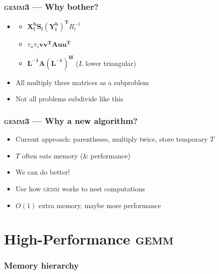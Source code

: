\documentclass{beamer}
\newcommand*{\gemmt}{{\textsc{gemm3}}}
\newcommand*{\gemm}{{\textsc{gemm}}}
\begin{document}
\begin{frame}
  \frametitle{\gemmt{} --- Why bother?}
  \begin{itemize}
  \item
    \begin{itemize}
    \item $\bm{X_i^b S_i (Y_i^b)^T}R_i^{-1}$
    \item $\tau_u\tau_v \bm{vv^TAuu^T}$
    \item$\bm{L^{-1}A(L^{-1})^H}$ ($L$ lower triangular)
    \end{itemize}
  \item All multiply three matrices as a subproblem
  \item Not all problems subdivide like this
  \end{itemize}
\end{frame}

\begin{frame}
  \frametitle{\gemmt{} --- Why a new algorithm?}
  \begin{itemize}
  \item Current approach: parentheses, multiply twice, store temporary $T$
  \item $T$ often eats memory (\& performance)
  \item We can do better!
  \item Use how \gemm{} works to nest computations
  \item $O(1)$ extra memory, maybe more performance
  \end{itemize}
\end{frame}

\section[\gemm{}]{High-Performance \gemm{}}
\frame{\sectionpage}

\begin{frame}
  \frametitle{Memory hierarchy}
\end{frame}
\end{document}

